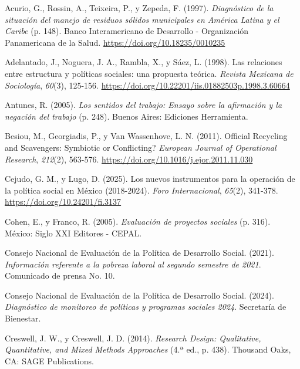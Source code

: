 \documentclass[
  spanish,
  11.5pt,
  170mm x 240mmpaper,
]{scrbook}
\newlength{\cslhangindent}
\newenvironment{CSLReferences}[2] %
 {\begin{list}{}{%
  \setlength{\itemindent}{0pt}
  \setlength{\leftmargin}{0pt}
  \setlength{\parsep}{0pt}
  \ifodd #1
   \setlength{\leftmargin}{\cslhangindent}
   \setlength{\itemindent}{-1\cslhangindent}
  \fi
  \setlength{\itemsep}{#2\baselineskip}}}
 {\end{list}}
\begin{document}
\protect{}\label{refs}
\begin{CSLReferences}{1}{0}
Acurio, G., Rossin, A., Teixeira, P., y Zepeda, F. (1997).
\emph{{Diagnóstico de la situación del manejo de residuos sólidos
municipales en América Latina y el Caribe}} (p. 148). Banco
Interamericano de Desarrollo - Organización Panamericana de la Salud.
\url{https://doi.org/10.18235/0010235}

Adelantado, J., Noguera, J. A., Rambla, X., y Sáez, L. (1998). {Las
relaciones entre estructura y políticas sociales: una propuesta
teórica}. \emph{Revista Mexicana de Sociología}, \emph{60}(3), 125-156.
\url{https://doi.org/10.22201/iis.01882503p.1998.3.60664}

Antunes, R. (2005). \emph{{Los sentidos del trabajo: Ensayo sobre la
afirmación y la negación del trabajo}} (p. 248). Buenos Aires: Ediciones
Herramienta.

Besiou, M., Georgiadis, P., y Van Wassenhove, L. N. (2011). Official
Recycling and Scavengers: {Symbiotic} or Conflicting? \emph{European
Journal of Operational Research}, \emph{212}(2), 563-576.
\url{https://doi.org/10.1016/j.ejor.2011.11.030}

Cejudo, G. M., y Lugo, D. (2025). {Los nuevos instrumentos para la
operación de la política social en México (2018-2024)}. \emph{Foro
Internacional}, \emph{65}(2), 341-378.
\url{https://doi.org/10.24201/fi.3137}

Cohen, E., y Franco, R. (2005). \emph{{Evaluación de proyectos
sociales}} (p. 316). México: Siglo XXI Editores - CEPAL.

Consejo Nacional de Evaluación de la Política de Desarrollo Social.
(2021). \emph{{Información referente a la pobreza laboral al segundo
semestre de 2021}}. Comunicado de prensa No. 10.

Consejo Nacional de Evaluación de la Política de Desarrollo Social.
(2024). \emph{{Diagnóstico de monitoreo de políticas y programas
sociales 2024}}. Secretaría de Bienestar.

Creswell, J. W., y Creswell, J. D. (2014). \emph{Research Design:
{Qualitative}, Quantitative, and Mixed Methods Approaches} (4.ª ed., p.
438). Thousand Oaks, CA: SAGE Publications.


\end{CSLReferences}
\end{document}
